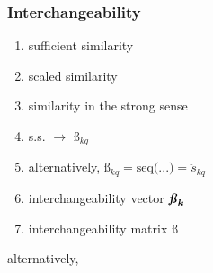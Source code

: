 \documentclass{elsarticle} %
\begin{document}
\subsubsection{Interchangeability}
\begin{enumerate}
    \item sufficient similarity
    \item scaled similarity
    \item similarity in the strong sense
    \item s.s. $\rightarrow$ $\textit{\ss}_{kq}$
    \item alternatively, $\textit{\ss}_{kq} = \text{seq(...)} = \ddot{s}_{kq}$
    \item interchangeability vector $\boldsymbol{\textbf{\textit{\ss}}_k}$
    \item interchangeability matrix $\boldsymbol{\textbf{\ss}}$
\end{enumerate}
alternatively,
\end{document}
